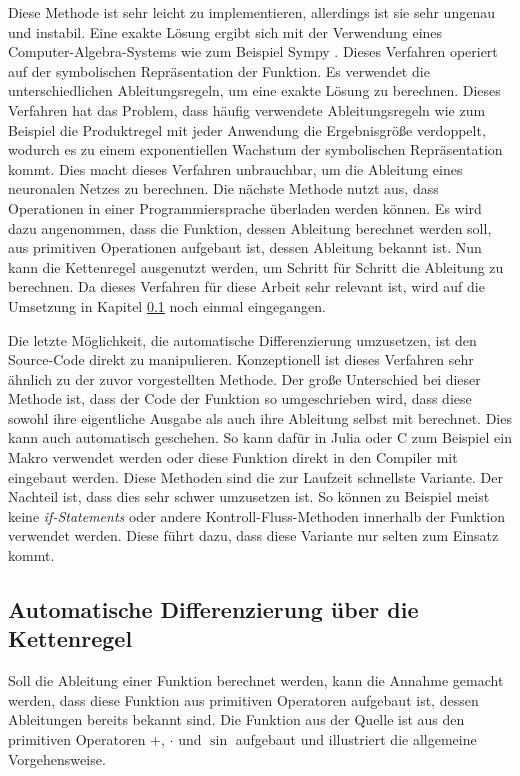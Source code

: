 Diese Methode ist sehr leicht zu implementieren, allerdings ist sie sehr ungenau und instabil.
Eine exakte Lösung ergibt sich mit der Verwendung eines Computer-Algebra-Systems wie zum Beispiel Sympy \cite{sympy}.
Dieses Verfahren operiert auf der symbolischen Repräsentation der Funktion.
Es verwendet die unterschiedlichen Ableitungsregeln, um eine exakte Lösung zu berechnen.
Dieses Verfahren hat das Problem, dass häufig verwendete Ableitungsregeln wie zum Beispiel die Produktregel
mit jeder Anwendung die Ergebnisgröße verdoppelt, wodurch es zu einem exponentiellen Wachstum 
der symbolischen Repräsentation kommt.
Dies macht dieses Verfahren unbrauchbar, um die Ableitung eines neuronalen Netzes zu berechnen.
Die nächste Methode nutzt aus, dass Operationen in einer Programmiersprache überladen werden können.
Es wird dazu angenommen, dass die Funktion, dessen Ableitung berechnet werden soll, aus primitiven Operationen aufgebaut ist, dessen Ableitung bekannt ist.
Nun kann die Kettenregel ausgenutzt werden, um Schritt für Schritt die Ableitung zu berechnen.
Da dieses Verfahren für diese Arbeit sehr relevant ist, wird auf die Umsetzung in Kapitel \ref{sec:ketten_regel} noch einmal eingegangen.

Die letzte Möglichkeit, die automatische Differenzierung umzusetzen, ist den Source-Code direkt zu manipulieren.
Konzeptionell ist dieses Verfahren sehr ähnlich zu der zuvor vorgestellten Methode. 
Der große Unterschied bei dieser Methode ist, dass der Code der Funktion so umgeschrieben wird, 
dass diese sowohl ihre eigentliche Ausgabe als auch ihre Ableitung selbst mit berechnet.
Dies kann auch automatisch geschehen.
So kann dafür in Julia oder C zum Beispiel ein Makro verwendet werden oder diese Funktion direkt in den Compiler mit eingebaut werden.
Diese Methoden sind die zur Laufzeit schnellste Variante.
Der Nachteil ist, dass dies sehr schwer umzusetzen ist.
So können zu Beispiel meist keine \textit{if-Statements} oder andere Kontroll-Fluss-Methoden innerhalb der Funktion verwendet werden. 
Diese führt dazu, dass diese Variante nur selten zum Einsatz kommt.

\subsection{Automatische Differenzierung über die Kettenregel} \label{sec:ketten_regel}

Soll die Ableitung einer Funktion berechnet werden, 
kann die Annahme gemacht werden, 
dass diese Funktion aus primitiven Operatoren aufgebaut ist, dessen Ableitungen bereits bekannt sind.
Die Funktion aus der Quelle \cite{autodiff_example} ist aus den primitiven Operatoren $+$, $\cdot$ und $\sin$ aufgebaut und illustriert die allgemeine Vorgehensweise.

